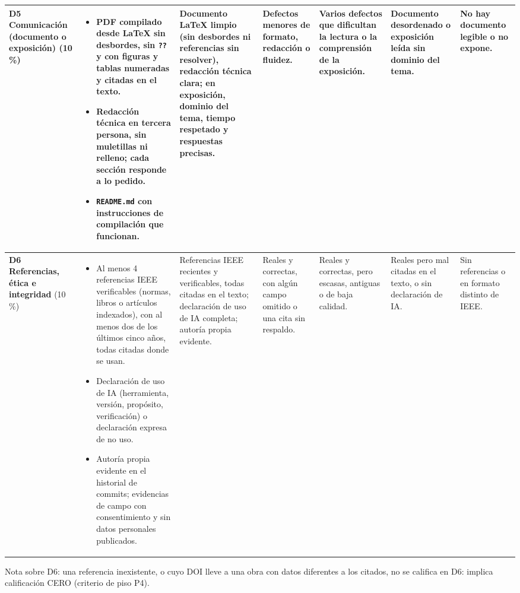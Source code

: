 \documentclass[11pt]{article}
\begin{document}
\begin{landscape}
{\begin{longtable}{|L{2.4cm}|L{5.6cm}|L{3.1cm}|L{2.8cm}|L{2.8cm}|L{2.7cm}|L{2.1cm}|}
	\textbf{D5 Comunicación (documento o exposición)} (10\,\%) & \begin{itemize}[leftmargin=9pt,itemsep=0pt,topsep=0pt,parsep=0pt,partopsep=0pt,after=\vspace{-\baselineskip}]\item PDF compilado desde \LaTeX{} sin desbordes, sin \texttt{??} y con figuras y tablas numeradas y citadas en el texto.\item Redacción técnica en tercera persona, sin muletillas ni relleno; cada sección responde a lo pedido.\item \texttt{README.md} con instrucciones de compilación que funcionan.\end{itemize} & Documento \LaTeX{} limpio (sin desbordes ni referencias sin resolver), redacción técnica clara; en exposición, dominio del tema, tiempo respetado y respuestas precisas. & Defectos menores de formato, redacción o fluidez. & Varios defectos que dificultan la lectura o la comprensión de la exposición. & Documento desordenado o exposición leída sin dominio del tema. & No hay documento legible o no expone.\\
	\hline
	\textbf{D6 Referencias, ética e integridad} (10\,\%) & \begin{itemize}[leftmargin=9pt,itemsep=0pt,topsep=0pt,parsep=0pt,partopsep=0pt,after=\vspace{-\baselineskip}]\item Al menos 4 referencias IEEE verificables (normas, libros o artículos indexados), con al menos dos de los últimos cinco años, todas citadas donde se usan.\item Declaración de uso de IA (herramienta, versión, propósito, verificación) o declaración expresa de no uso.\item Autoría propia evidente en el historial de commits; evidencias de campo con consentimiento y sin datos personales publicados.\end{itemize} & Referencias IEEE recientes y verificables, todas citadas en el texto; declaración de uso de IA completa; autoría propia evidente. & Reales y correctas, con algún campo omitido o una cita sin respaldo. & Reales y correctas, pero escasas, antiguas o de baja calidad. & Reales pero mal citadas en el texto, o sin declaración de IA. & Sin referencias o en formato distinto de IEEE.\\
	\hline
\end{longtable}
}
{\footnotesize Nota sobre D6: una referencia inexistente, o cuyo DOI lleve a una obra con datos diferentes a los citados, no se califica en D6: implica calificación CERO (criterio de piso P4).}
\end{landscape}
\end{document}

